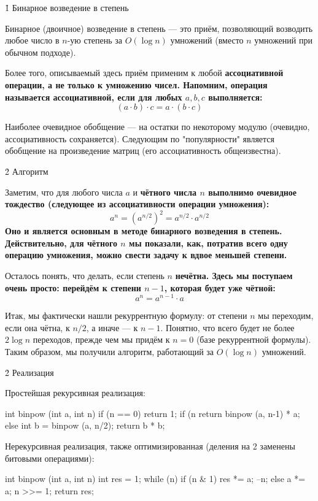 \h1{ Бинарное возведение в степень }


Бинарное (двоичное) возведение в степень --- это приём, позволяющий возводить любое число в $n$-ую степень за $O(\log n)$ умножений (вместо $n$ умножений при обычном подходе).

Более того, описываемый здесь приём применим к любой \bf{ассоциативной} операции, а не только к умножению чисел. Напомним, операция называется ассоциативной, если для любых $a, b, c$ выполняется:
$$ (a \cdot b) \cdot c = a \cdot (b \cdot c) $$

Наиболее очевидное обобщение --- на остатки по некоторому модулю (очевидно, ассоциативность сохраняется). Следующим по "популярности" является обобщение на произведение матриц (его ассоциативность общеизвестна).



\h2{ Алгоритм }

Заметим, что для любого числа $a$ и \bf{чётного} числа $n$ выполнимо очевидное тождество (следующее из ассоциативности операции умножения):
$$ a^n = (a^{n/2})^2 = a^{n/2} \cdot a^{n/2} $$
Оно и является основным в методе бинарного возведения в степень. Действительно, для чётного $n$ мы показали, как, потратив всего одну операцию умножения, можно свести задачу к вдвое меньшей степени.

Осталось понять, что делать, если степень $n$ \bf{нечётна}. Здесь мы поступаем очень просто: перейдём к степени $n-1$, которая будет уже чётной:
$$ a^n = a^{n-1} \cdot a $$

Итак, мы фактически нашли рекуррентную формулу: от степени $n$ мы переходим, если она чётна, к $n/2$, а иначе --- к $n-1$. Понятно, что всего будет не более $2 \log n$ переходов, прежде чем мы придём к $n = 0$ (базе рекуррентной формулы). Таким образом, мы получили алгоритм, работающий за $O (\log n)$ умножений.



\h2{ Реализация }

Простейшая рекурсивная реализация:

\code
int binpow (int a, int n) {
	if (n == 0)
		return 1;
	if (n %
		return binpow (a, n-1) * a;
	else {
		int b = binpow (a, n/2);
		return b * b;
	}
}
\endcode

Нерекурсивная реализация, также оптимизированная (деления на 2 заменены битовыми операциями):

\code
int binpow (int a, int n) {
	int res = 1;
	while (n)
		if (n & 1) {
			res *= a;
			--n;
		}
		else {
			a *= a;
			n >>= 1;
		}
	return res;
}
\endcode

